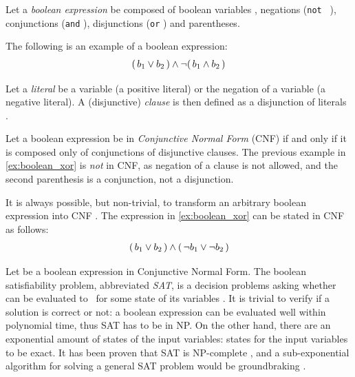 Let a \emph{boolean expression} be composed of boolean variables , negations (\texttt{not } \ilmath{\neg}), conjunctions (\texttt{and} \ilmath{\land}), disjunctions (\texttt{or} \ilmath{\lor}) and parentheses.

The following is an example of a boolean expression:
\begin{align}\label{ex:boolean_xor}
	(\, b_1 \lor b_2 \,) \land \neg (\, b_1 \land b_2 \,)
\end{align}

Let a \emph{literal} be a variable  (a positive literal) or the negation of a variable  (a negative literal). A (disjunctive) \emph{clause} is then defined as a disjunction of literals . 

Let a boolean expression be in \emph{Conjunctive Normal Form} (CNF) if and only if it is composed only of conjunctions of disjunctive clauses. The previous example in \cref{ex:boolean_xor} is \emph{not} in CNF, as negation of a clause is not allowed, and the second parenthesis is a conjunction, not a disjunction.

\begin{remark}
	It is always possible, but non-trivial, to transform an arbitrary boolean expression into CNF \cite{?} . The expression in \cref{ex:boolean_xor} can be stated in CNF as follows:
	\begin{align}\label{ex:cnf_xor}
		(\, b_1 \lor b_2 \,) \land (\, \neg b_1 \lor \neg b_2 \,)
	\end{align}
\end{remark}

Let \ilmath{\varphi} be a boolean expression in Conjunctive Normal Form. The boolean satisfiability problem, abbreviated \emph{SAT}, is a decision problems asking whether \ilmath{\varphi} can be evaluated to \true\ for some state of its variables . It is trivial to verify if a solution is correct or not: a boolean expression can be evaluated well within polynomial time, thus SAT has to be in NP. On the other hand, there are an exponential amount of states of the input variables:  states for the  input variables to be exact. It has been proven that SAT is NP-complete , and a sub-exponential algorithm for solving a general SAT problem would be groundbraking . 

